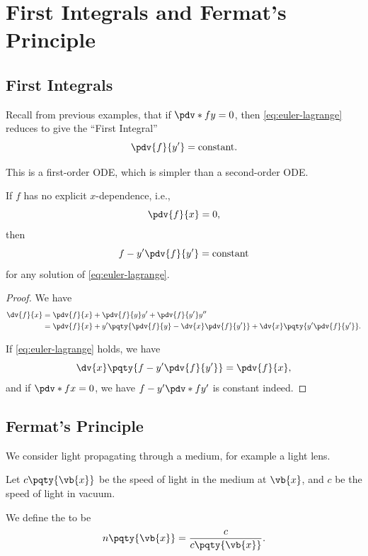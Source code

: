 \section{First Integrals and Fermat's Principle}

\subsection{First Integrals}

Recall from previous examples, that if \(\pdv*{f}{y} = 0\), then \eqref{eq:euler-lagrange} reduces to give the ``First Integral''
\[
    \pdv{f}{y'} = \text{constant}.
\]

This is a first-order ODE, which is simpler than a second-order ODE.

\begin{proposition}
    \label{prop:first-integral-x-inidependence}%
    If \(f\) has no explicit \(x\)-dependence, i.e.,
    \[
        \pdv{f}{x} = 0,
    \]
    then
    \[
        f - y' \pdv{f}{y'} = \text{constant}
    \]
    for any solution of \eqref{eq:euler-lagrange}.
\end{proposition}

\begin{proof}
    We have
    \begin{align*}
        \dv{f}{x} &= \pdv{f}{x} + \pdv{f}{y} y' + \pdv{f}{y'} y'' \\
        &= \pdv{f}{x} + y' \pqty{\pdv{f}{y} - \dv{x} \pdv{f}{y'}} + \dv{x} \pqty{y' \pdv{f}{y'}}.
    \end{align*}

    If \eqref{eq:euler-lagrange} holds, we have
    \[
        \dv{x} \pqty{f - y' \pdv{f}{y'}} = \pdv{f}{x},
    \]
    and if \(\pdv*{f}{x} = 0\), we have \(f - y' \pdv*{f}{y'}\) is constant indeed.
\end{proof}

\subsection{Fermat's Principle}

We consider light propagating through a medium, for example a light lens.

Let \(c\pqty{\vb{x}}\) be the speed of light in the medium at \(\vb{x}\), and \(c\) be the speed of light in vacuum.

\begin{definition}
    We define the  to be
    \[
        n\pqty{\vb{x}} = \frac{c}{c\pqty{\vb{x}}}.
    \]
\end{definition}

